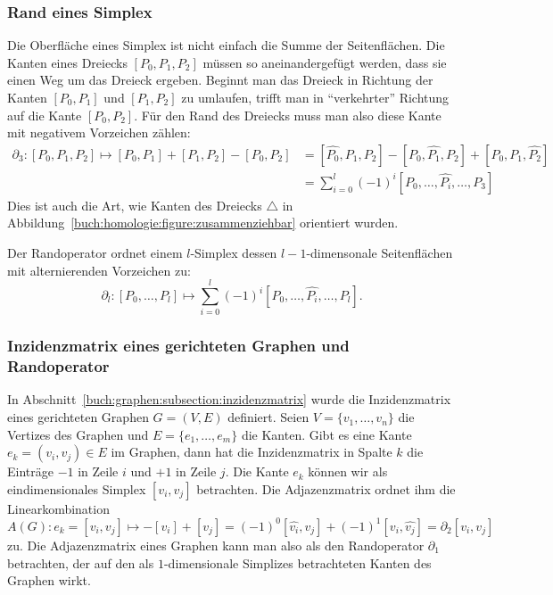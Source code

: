 \subsubsection{Rand eines Simplex}
Die Oberfläche eines Simplex ist nicht einfach die Summe der
Seitenflächen.
Die Kanten eines Dreiecks $[P_0,P_1,P_2]$ müssen so aneinandergefügt
werden, dass sie einen Weg um das Dreieck ergeben.
Beginnt man das Dreieck in Richtung der Kanten
$[P_0,P_1]$ und $[P_1,P_2]$ zu umlaufen, trifft man in
``verkehrter'' Richtung auf die Kante $[P_0,P_2]$.
Für den Rand des Dreiecks muss man also diese Kante mit negativem
Vorzeichen zählen:
\begin{align*}
\partial_3 \colon
[P_0,P_1,P_2]
\mapsto
[P_0,P_1]
+ [P_1,P_2]
- [P_0,P_2]
&=
[\widehat{P_0},P_1,P_2]
-[P_0,\widehat{P_1},P_2]
+[P_0,P_1,\widehat{P_2}]
\\
&=
\sum_{i=0}^l (-1)^i [P_0,\dots,\widehat{P_i},\dots,P_3]
\end{align*}
Dies ist auch die Art, wie Kanten des Dreiecks $\triangle$ 
in Abbildung~\ref{buch:homologie:figure:zusammenziehbar}
orientiert wurden.

\begin{definition}
\label{buch:def:randoperator}
Der Randoperator ordnet einem $l$-Simplex dessen $l-1$-dimensonale
Seitenflächen mit alternierenden Vorzeichen zu:
\[
\partial_l : [P_0,\dots,P_l]
\mapsto
\sum_{i=0}^l (-1)^i [P_0,\dots,\widehat{P_i},\dots,P_l].
\]
\end{definition}

\subsubsection{Inzidenzmatrix eines gerichteten Graphen und Randoperator}
In Abschnitt~\ref{buch:graphen:subsection:inzidenzmatrix} wurde die
Inzidenzmatrix eines gerichteten Graphen $G=(V,E)$ definiert.
Seien $V=\{v_1,\dots,v_n\}$ die Vertizes des Graphen und
$E=\{e_1,\dots,e_m\}$ die Kanten. 
Gibt es eine Kante $e_k = (v_i,v_j)\in E$ im Graphen, dann hat die Inzidenzmatrix
in Spalte $k$ die Einträge $-1$ in Zeile $i$ und $+1$ in Zeile $j$.
Die Kante $e_k$ können wir als eindimensionales Simplex $[v_i,v_j]$
betrachten.
Die Adjazenzmatrix ordnet ihm die Linearkombination
\[
A(G)\colon e_k=[v_i,v_j] \mapsto -[v_i] +[v_j]
= (-1)^0 [\widehat{v_i},v_j] + (-1)^1 [v_i,\widehat{v_j}]
=
\partial_2 [v_i,v_j]
\]
zu.
Die Adjazenzmatrix eines Graphen kann man also als den Randoperator
$\partial_1$ betrachten, der auf den als $1$-dimensionale Simplizes
betrachteten Kanten des Graphen wirkt.

